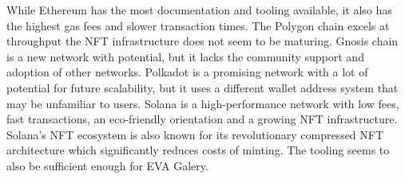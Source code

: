 \begin{table}[htb!]
\begin{tabular}{|l|l|l|l|l|l|l|l|}
    \end{tabular}
    \label{tab:networks}
    \end{table}


While Ethereum has the most documentation and tooling available, it also has the highest gas fees and slower transaction times. The Polygon chain excels at throughput the NFT infrastructure does not seem to be maturing. Gnosis chain is a new network with potential, but it lacks the community support and adoption of other networks. Polkadot is a promising network with a lot of potential for future scalability, but it uses a different wallet address system that may be unfamiliar to users. Solana is a high-performance network with low fees, fast transactions, an eco-friendly orientation and a growing NFT infrastructure. Solana's NFT ecosystem is also known for its revolutionary compressed NFT architecture which significantly reduces costs of minting. The tooling seems to also be sufficient enough for EVA Galery. 
